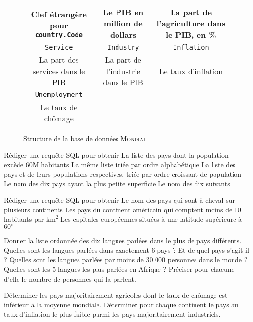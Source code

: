 \begin{figure}[h!]
{\begin{tabular}{|ccc|}
			Clef étrangère pour \texttt{country.Code} & Le PIB en million de dollars       & La part de l'agriculture dans le PIB, en \% \\
			\hline
			\texttt{Service}                          & \texttt{Industry}                  & \texttt{Inflation}                          \\
			La part des services dans le PIB          & La part de l'industrie dans le PIB & Le taux d'inflation                         \\
			\hline
			\texttt{Unemployment}                     &                                    &                                             \\
			Le taux de chômage                        &                                    &                                             \\
			\hline
		\end{tabular}
	}
	\caption{Structure de la base de données \textsc{Mondial}}
	\label{fig:mondiale}
\end{figure}


\begin{enonce}
	Rédiger une requête SQL pour obtenir
	\ssques La liste des pays dont la population excède 60M habitants
	\ssques La même liste triée par ordre alphabétique
	\ssques La liste des pays et de leurs populations respectives, triée par ordre croissant de population
	\ssques Le nom des dix pays ayant la plus petite superficie
	\ssques Le nom des dix suivants
\end{enonce}

\begin{enonce}[Jointures]
	Rédiger une requête SQL pour obtenir
	\ssques Le nom des pays qui sont à cheval sur plusieurs continents
	\ssques Les pays du continent américain qui comptent moins de 10 habitants par $ \textrm{km}^2 $
	\ssques Les capitales européennes situées à une latitude supérieure à $ 60^{\circ} $
\end{enonce}

\begin{enonce}
	\ssques Donner la liste ordonnée des dix langues parlées dans le plus de pays différents.
	\ssques Quelles sont les langues parlées dans exactement 6 pays ? Et de quel pays s'agit-il ?
	\ssques Quelles sont les langues parlées par moins de 30 000 personnes dans le monde ?
	\ssques Quelles sont les 5 langues les plus parlées en Afrique ? Préciser pour chacune d'elle le nombre de personnes qui la parlent.
\end{enonce}

\begin{enonce}
	\ssques Déterminer les pays majoritairement agricoles dont le taux de chômage est inférieur à la moyenne mondiale.
	\ssques Déterminer pour chaque continent le pays au taux d'inflation le plus faible parmi les pays majoritairement industriels.
\end{enonce}
